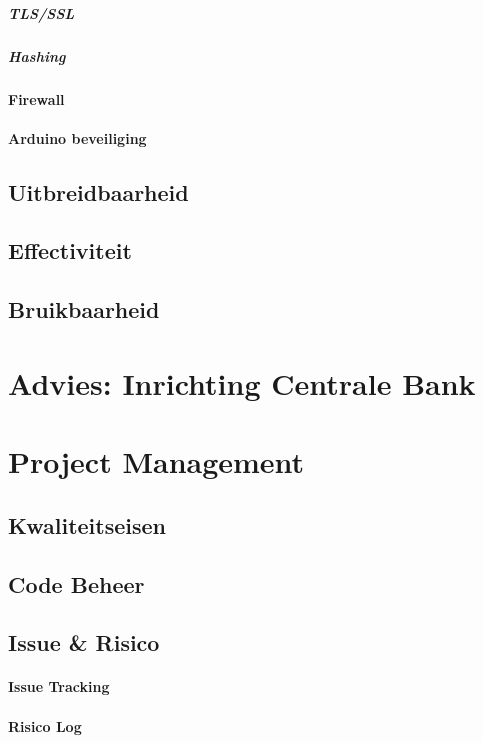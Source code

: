 \documentclass{article}
\begin{document}
\subparagraph{TLS/SSL}
\subparagraph{Hashing}

\paragraph{Firewall}
\paragraph{Arduino beveiliging}

\subsection{Uitbreidbaarheid}
\subsection{Effectiviteit}
\subsection{Bruikbaarheid}

\clearpage
\newpage

\section{Advies: Inrichting Centrale Bank}

\clearpage
\newpage

\section{Project Management}

\subsection{Kwaliteitseisen}
\subsection{Code Beheer}
\subsection{Issue \& Risico}
\paragraph{Issue Tracking}
\paragraph{Risico Log}
\end{document}
